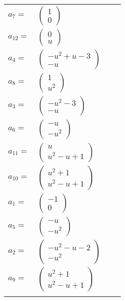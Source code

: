\documentclass[1p]{elsarticle_modified}
\theoremstyle{definition}
\begin{document}
\begin{tabular}{m{7pt} m{180pt} m{7pt} m{180pt} }
\flushright $a_{7}=$&$\begin{pmatrix}1\\0\end{pmatrix}$ \\
\flushright $a_{12}=$&$\begin{pmatrix}0\\u\end{pmatrix}$ \\
\flushright $a_{4}=$&$\begin{pmatrix}- u^2+u-3\\- u\end{pmatrix}$ \\
\flushright $a_{8}=$&$\begin{pmatrix}1\\u^2\end{pmatrix}$ \\
\flushright $a_{3}=$&$\begin{pmatrix}- u^2-3\\- u\end{pmatrix}$ \\
\flushright $a_{6}=$&$\begin{pmatrix}- u\\- u^2\end{pmatrix}$ \\
\flushright $a_{11}=$&$\begin{pmatrix}u\\u^2- u+1\end{pmatrix}$ \\
\flushright $a_{10}=$&$\begin{pmatrix}u^2+1\\u^2- u+1\end{pmatrix}$ \\
\flushright $a_{1}=$&$\begin{pmatrix}-1\\0\end{pmatrix}$ \\
\flushright $a_{5}=$&$\begin{pmatrix}- u\\- u^2\end{pmatrix}$ \\
\flushright $a_{2}=$&$\begin{pmatrix}- u^2- u-2\\- u^2\end{pmatrix}$ \\
\flushright $a_{9}=$&$\begin{pmatrix}u^2+1\\u^2- u+1\end{pmatrix}$\\&\end{tabular}
\end{document}
